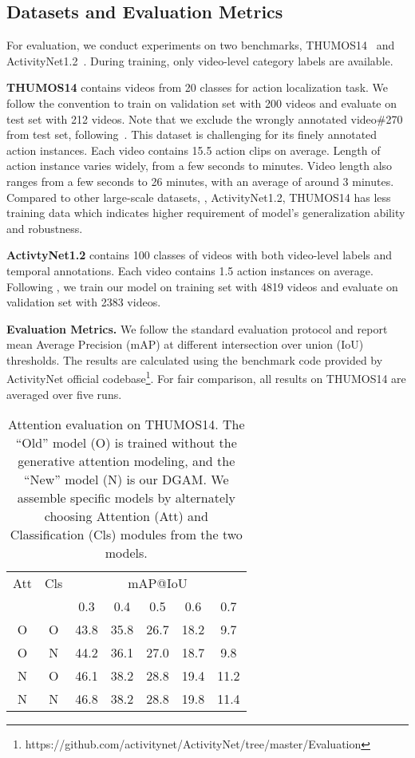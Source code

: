 \documentclass[10pt,twocolumn,letterpaper]{article}
\begin{document}
\subsection{Datasets and Evaluation Metrics}

For evaluation, we conduct experiments on two benchmarks, THUMOS14~\cite{idrees2017thumos} and ActivityNet1.2~\cite{caba2015activitynet}. During training, only video-level category labels are available.

\textbf{THUMOS14} contains videos from 20 classes for action localization task.
We follow the convention to train on validation set with 200 videos and evaluate on test set with 212 videos.
Note that we exclude the wrongly annotated video\#270 from test set, following~\cite{nguyen2019weakly,zhao2017temporal}.
This dataset is challenging for its finely annotated action instances.
Each video contains 15.5 action clips on average.
Length of action instance varies widely, from a few seconds to minutes.
Video length also ranges from a few seconds to 26 minutes, with an average of around 3 minutes.
Compared to other large-scale datasets, \eg, ActivityNet1.2, THUMOS14 has less training data which indicates higher requirement of model's generalization ability and robustness.

\textbf{ActivtyNet1.2} contains 100 classes of videos with both video-level labels and temporal annotations.
Each video contains 1.5 action instances on average. Following \cite{wang2017untrimmednets,shou2018autoloc}, we train our model on training set with 4819 videos and evaluate on validation set with 2383 videos.

\textbf{Evaluation Metrics.} We follow the standard evaluation protocol and report mean Average Precision (mAP) at different intersection over union (IoU) thresholds.
The results are calculated using the benchmark code provided by ActivityNet official codebase\footnote{https://github.com/activitynet/ActivityNet/tree/master/Evaluation}. For fair comparison, all results on THUMOS14 are averaged over five runs.

\begin{table}[t]\small
\caption{Attention evaluation on THUMOS14. The ``Old'' model (O) is trained without the generative attention modeling, and the ``New'' model (N) is our DGAM. We assemble specific models by alternately choosing Attention (Att) and Classification (Cls) modules from the two models.}
\label{table:module_assemble}
\begin{center}
\begin{tabular}{c c|c c c c c}
\hline
Att & Cls & \multicolumn{5}{c}{mAP@IoU} \\
 & & 0.3 & 0.4 & 0.5 & 0.6 & 0.7 \\
\hline \hline
O & O & 43.8 & 35.8 & 26.7 & 18.2 & 9.7 \\
O & N & 44.2 & 36.1 & 27.0 & 18.7 & 9.8 \\
N & O & 46.1 & 38.2 & 28.8 & 19.4 & 11.2 \\
N & N & 46.8 & 38.2 & 28.8 & 19.8 & 11.4 \\
\hline
\end{tabular}
\end{center}
\vspace{-1em}
\end{table}
\end{document}

